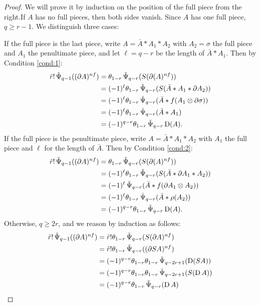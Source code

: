 \begin{proof}
	We will prove it by induction on the position of the full piece from the right.If $A$ has no full pieces, then both sides vanish. Since $A$ has one full piece, $q\geq r-1$. We distinguish three cases:

	If the full piece is the last piece, write $A=\bar{A}*A_1*A_2$ with $A_2 = \sigma$ the full piece and $A_1$ the penultimate piece, and let $\ell = q-r$ be the length of $\bar{A}*A_1$. Then by Condition \eqref{cond:1}: 
	\begin{align*}
	    \tilde{r}!\operatorname{\check{\Psi}}_{q-1}((\partial A)^{nf}) &=
		\theta_{1-r} \operatorname{\check{\Psi}}_{q-r}(S(\partial(A)^{nf})) \\
		&= (-1)^{\ell} \theta_{1-r}\operatorname{\check{\Psi}}_{q-r}(S(\bar{A}*A_1*\partial A_2)) \\
		&= (-1)^{\ell} \theta_{1-r}\operatorname{\check{\Psi}}_{q-r}(\bar{A}*f(A_1\otimes \partial \sigma)) \\
		&= (-1)^{\ell} \theta_{1-r}\operatorname{\check{\Psi}}_{q-r}(\bar{A}*A_1) \\
		&= (-1)^{q-r}\theta_{1-r}\operatorname{\check{\Psi}}_{q-r}\operatorname{D}(A).
	\end{align*}
	If the full piece is the penultimate piece, write $A=\bar{A}*A_1*A_2$ with $A_1$ the full piece and $\ell$ for the length of $\bar{A}$. Then by Condition \eqref{cond:2}:
	\begin{align*}
	    \tilde{r}!\operatorname{\check{\Psi}}_{q-1}((\partial A)^{nf}) &=
        \theta_{1-r}\operatorname{\check{\Psi}}_{q-r}(S(\partial(A)^{nf})) \\
        &= (-1)^{\ell}\theta_{1-r}\operatorname{\check{\Psi}}_{q-r}(S(\bar{A}*\partial A_1* A_2)) \\
		&= (-1)^{\ell} \operatorname{\check{\Psi}}_{q-r}(\bar{A}*f(\partial A_1\otimes A_2)) \\
		&= (-1)^{\ell} \theta_{1-r}\operatorname{\check{\Psi}}_{q-r}(\bar{A}*\rho(A_2)) \\
		&= (-1)^{q-r}\theta_{1-r}\operatorname{\check{\Psi}}_{q-r}\operatorname{D}(A).
	\end{align*}
	   Otherwise, $q\geq 2r$, and we reason by induction as follows: %
    \begin{align*}
        \tilde{r}!\operatorname{\check{\Psi}}_{q-1}((\partial A)^{nf}) 
        &= \tilde{r}!\theta_{1-r} \operatorname{\check{\Psi}}_{q-r}(S(\partial A)^{nf}) \\
        &= \tilde{r}!\theta_{1-r} \operatorname{\check{\Psi}}_{q-r}((\partial SA)^{nf}) \\
        &= (-1)^{q-r}\theta_{1-r}\theta_{1-r} \operatorname{\check{\Psi}}_{q-2r+1}(\operatorname{D} (SA)) \\
        &= (-1)^{q-r}\theta_{1-r}\theta_{1-r} \operatorname{\check{\Psi}}_{q-2r+1}(S(\operatorname{D} A)) \\
        &= (-1)^{q-r}\theta_{1-r} \operatorname{\check{\Psi}}_{q-r}(\operatorname{D} A)\qedhere
    \end{align*}
\end{proof}





